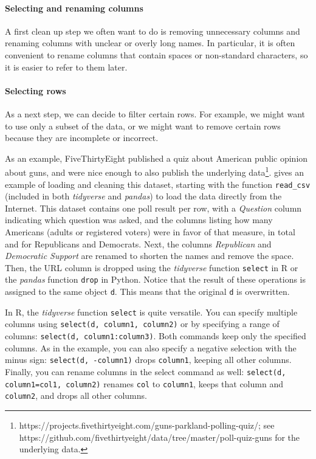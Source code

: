 \paragraph{Selecting and renaming columns}
A first clean up step we often want to do is removing unnecessary columns and renaming columns with unclear or overly long names.
In particular, it is often convenient to rename columns that contain spaces or non-standard characters, so it is easier to refer to them later.

\paragraph{Selecting rows}
As a next step, we can decide to filter certain rows.
For example, we might want to use only a subset of the data,
or we might want to remove certain rows because they are incomplete or incorrect.

As an example, FiveThirtyEight published a quiz about American public opinion about guns,
and were nice enough to also publish the underlying data\footnote{https://projects.fivethirtyeight.com/guns-parkland-polling-quiz/; see https://github.com/fivethirtyeight/data/tree/master/poll-quiz-guns for the underlying data.}.
 gives an example of loading and cleaning this dataset, starting with the function \texttt{read\_csv} (included in both \emph{tidyverse} and \emph{pandas}) to load the data directly from the Internet.
This dataset contains one poll result per row, with a \emph{Question} column indicating which question was asked,
and the columns listing how many Americans (adults or registered voters) were in favor of that measure, in total and for Republicans and Democrats.
Next, the columns \emph{Republican} and \emph{Democratic Support} are renamed to shorten the names and remove the space.
Then, the URL column is dropped using the \emph{tidyverse} function \texttt{select} in R or the \emph{pandas} function \texttt{drop} in Python.
Notice that the result of these operations is assigned to the same object \texttt{d}.
This means that the original \texttt{d} is overwritten.

\begin{feature}
  In R, the \emph{tidyverse} function \texttt{select} is quite versatile.
  You can specify multiple columns using \verb|select(d, column1, column2)| 
  or by specifying a range of columns: \verb|select(d, column1:column3)|.
  Both commands keep only the specified columns.
  As in the example, you can also specify a negative selection with the minus sign:
  \verb|select(d, -column1)| drops \texttt{column1}, keeping all other columns.
  Finally, you can rename columns in the select command as well:
  \verb|select(d, column1=col1, column2)| renames \texttt{col} to \texttt{column1},
  keeps that column and \texttt{column2}, and drops all other columns.
\end{feature}


